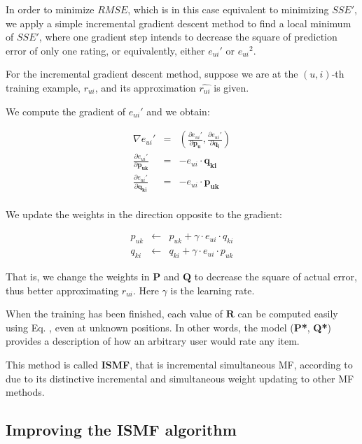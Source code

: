 \documentclass[11pt]{amsart}
\begin{document}
In order to minimize $RMSE$, which is in this case equivalent to minimizing $SSE'$, we apply a simple incremental gradient descent method to find a local minimum of $SSE'$, where one gradient step intends to decrease the square of prediction error of only one rating, or equivalently, either ${e_{ui}}'$ or ${e_{ui}}^2$.

For the incremental gradient descent method, suppose we are at the $(u,i)$-th training example, $r_{ui}$, and its approximation $\hat{r_{ui}}$ is given.

We compute the gradient of ${e_{ui}}'$ and we obtain:

\begin{eqnarray}
  \nabla{{e_{ui}}'} &=& \left( \frac{\partial{e_{ui}}'}{\partial{\mathbf{p_u}}}, 
                               \frac{\partial{e_{ui}}'}{\partial{\mathbf{q_i}}} \right) \\
 \frac{\partial{e_{ui}}'}{\partial{\mathbf{p_{uk}}}} &=& -e_{ui} \cdot \mathbf{q_{ki}} \\ 
 \frac{\partial{e_{ui}}'}{\partial{\mathbf{q_{ki}}}} &=& -e_{ui} \cdot \mathbf{p_{uk}} \\
\end{eqnarray}

We update the weights in the direction opposite to the gradient:

\begin{eqnarray}
  p_{uk} &\leftarrow& p_{uk} + \gamma \cdot e_{ui} \cdot q_{ki} \\
  q_{ki} &\leftarrow& q_{ki} + \gamma \cdot e_{ui} \cdot p_{uk} 
\end{eqnarray}

That is, we change the weights in $\mathbf{P}$ and $\mathbf{Q}$ to decrease the square of actual error, thus better approximating $r_{ui}$. Here $\gamma$ is the learning rate. 

When the training has been finished, each value of $\mathbf{R}$ can be computed easily using Eq. , even at unknown positions. In other words, the model (\textbf{P*}, \textbf{Q*}) provides a description of how an arbitrary user would rate any item.

This method is called \textbf{ISMF}, that is incremental simultaneous MF, according to \cite{takacs09scalable} due to its distinctive incremental and simultaneous weight updating to other MF methods.

\subsection{Improving the ISMF algorithm}
\label{rismf}
\end{document}
